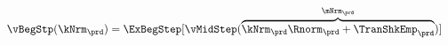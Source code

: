   \begin{equation}\begin{gathered}\begin{aligned}
        \vBegStp(\kNrm_{\prd}) & = \ExBegStep[\vMidStep(\overbrace{\kNrm_{\prd} \Rnorm_{\prd} + \TranShkEmp_{\prd}}^{\mNrm_{\prd}})]  \label{eq:vBegStp}
      \end{aligned}\end{gathered}\end{equation}
